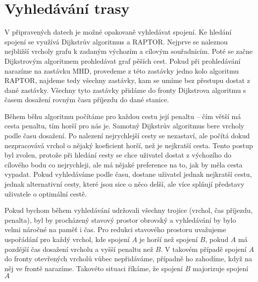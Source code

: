 \chapter{Vyhledávání trasy}
V připravených datech je možné opakovaně vyhledávat spojení. Ke hledání spojení
se využívá Dijkstrův algoritmus a RAPTOR. Nejprve se naleznou nejbližší vrcholy
grafu k zadaným výchozím a cílovým souřadnicím. Poté se začne Dijkstrovým
algoritmem prohledávat graf pěších cest. Pokud při prohledávání narazíme na
zastávku MHD, provedeme z této zastávky jedno kolo algoritmu RAPTOR, najdeme
tedy všechny zastávky, kam se umíme bez přestupu dostat z dané zastávky. Všechny
tyto zastávky přidáme do fronty Dijkstrova algoritmu s časem dosažení rovným
času příjezdu do dané stanice. 

Během běhu algoritmu počítáme pro každou cestu její penaltu -- čím větší má
cesta penaltu, tím horší pro nás je. Samotný Dijkstrův algoritmus bere vrcholy
podle času dosažení. Po nalezení nejrychlejší cesty se nezastaví, ale počítá
dokud nezpracovává vrchol o nějaký koeficient horší, než je nejkratší cesta. 
Tento postup byl zvolen, protože při hledání cesty se chce uživatel dostat z výchozího
do cílového bodu co nejrychleji, ale má nějaké preference na to, jak by měla
cesta vypadat. Pokud vyhledáváme podle času, dostane uživatel jednak nejkratší
cestu, jednak alternativní cesty, které jsou sice o něco delší, ale více splňují
představy uživatele o optimální cestě.

Pokud bychom během vyhledávání udržovali všechny trojice (vrchol, čas příjezdu,
penalta), byl by procházený stavový prostor obrovský a vyhledávání by bylo velmi
náročné na paměť i čas. Pro redukci stavového prostoru uvažujeme uspořádání pro
každý vrchol, kde spojení $A$ je horší než spojení $B$, pokud $A$ má pozdější
čas dosažení vrcholu a vyšší penaltu než $B$. V takovém případě spojení $A$ do
fronty otevřených vrcholů vůbec nepřidáváme, případně ho zahodíme, když na něj
ve frontě narazíme. Takovéto situaci říkáme, že spojení $B$ majorizuje spojení
$A$


